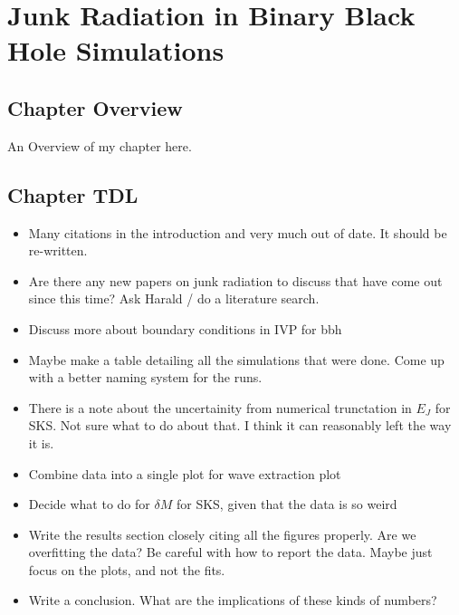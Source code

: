 
\chapter{Junk Radiation in Binary Black Hole Simulations}

\section{Chapter Overview}

An Overview of my chapter here.


\section{Chapter TDL}
\begin{itemize}

\item Many citations in the introduction and very much out of
  date. It should be re-written.

\item Are there any new papers on junk radiation to discuss that have
  come out since this time? Ask Harald / do a literature search.

\item Discuss more about boundary conditions in IVP for bbh

\item Maybe make a table detailing all the simulations that were
  done. Come up with a better naming system for the runs.

\item There is a note about the uncertainity from numerical
  trunctation in $E_J$ for SKS. Not sure what to do about that. I
  think it can reasonably left the way it is.

\item Combine data into a single plot for wave extraction plot

\item Decide what to do for $\delta M$ for SKS, given that the data is
  so weird

\item Write the results section closely citing all the figures
  properly. Are we overfitting the data? Be careful with how to report
  the data. Maybe just focus on the plots, and not the fits.

\item Write a conclusion. What are the implications of these kinds of
  numbers?

\end{itemize}


